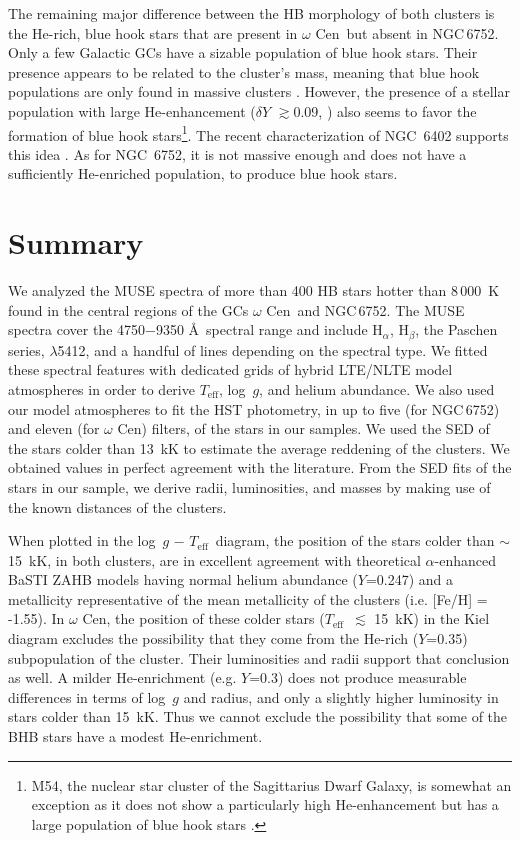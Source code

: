 \documentclass{aa}
\newcommand{\teff}{$T_{\text{eff}}$}
\newcommand{\Cen}{$\omega$ Cen}
\newcommand{\ngc}{NGC\,6752}
\newcommand{\loggt}{log~$g$ $-$ \teff}
\begin{document}
 The remaining major difference between the HB morphology of both clusters is the He-rich, blue hook stars that are present in \Cen\ but absent in \ngc. Only a few Galactic GCs have a sizable population of blue hook stars. Their presence appears to be related to the cluster's mass, meaning that blue hook populations are only found in massive clusters \citep{dieball2009,2010ApJ...718.1332B,johnson2017}. However, the presence of a stellar population with large He-enhancement ($\delta Y$ $\gtrsim$0.09, \citealt{milone2018}) also seems to favor the formation of blue hook stars\footnote{M54, the nuclear star cluster of the Sagittarius Dwarf Galaxy, is somewhat an exception as it does not show a particularly high He-enhancement \citep{milone2018} but has a large population of blue hook stars \citep{brown16}.}. The recent characterization of NGC~6402 supports this idea \citep{dantona2022}. As for NGC~6752, it is not massive enough and does not have a sufficiently He-enriched population, to produce blue hook stars.


\section{Summary}\label{sec:summary} 
 
We analyzed the MUSE spectra of more than 400 HB stars hotter than 8\,000~K found in the central regions of the GCs \Cen\ and \ngc. The MUSE spectra cover the 4750$-$9350 \AA\ spectral range and include H$_\alpha$, H$_\beta$, the Paschen series,  $\lambda$5412, and a handful of  lines depending on the spectral type. We fitted these spectral features with dedicated grids of hybrid LTE/NLTE model atmospheres in order to derive \teff, log~$g$, and helium abundance. We also used our model atmospheres to fit the HST photometry, in up to five (for \ngc) and eleven (for \Cen) filters, of the stars in our samples. We used the SED of the stars colder than 13~kK to estimate the average reddening of the clusters. We obtained values in perfect agreement with the literature. From the SED fits of the stars in our sample, we derive radii, luminosities, and masses by making use of the known distances of the clusters. 

When plotted in the \loggt\ diagram, the position of the stars colder than $\sim$15~kK, in both clusters, are in excellent agreement with theoretical $\alpha$-enhanced BaSTI ZAHB models having normal helium abundance ($Y$=0.247) and a metallicity representative of the mean metallicity of the clusters (i.e. [Fe/H] = -1.55). In \Cen, the position of these colder stars (\teff\ $\lesssim$ 15~kK) in the Kiel diagram excludes the possibility that they come from the He-rich ($Y$=0.35) subpopulation of the cluster. Their luminosities and radii 
support that conclusion as well. A milder He-enrichment (e.g. $Y$=0.3) does not produce measurable differences in terms of log~$g$ and radius, and only a slightly higher luminosity in stars colder than 15~kK. Thus we cannot exclude the possibility that some of the BHB stars have a modest He-enrichment.
\end{document}
